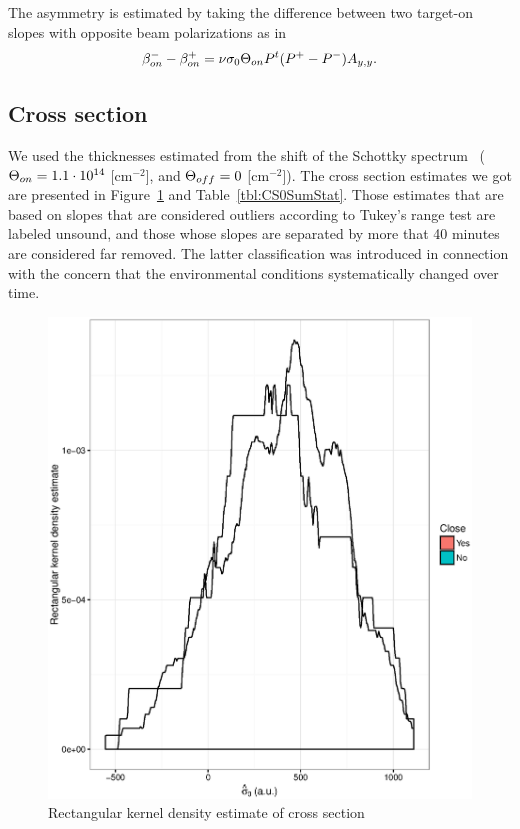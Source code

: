 \documentclass{report}
\begin{document}
The asymmetry is estimated by taking the difference between two target-on slopes with opposite beam polarizations as in
\[
	\slp[on]^- - \slp[on]^+ = \nu\CS[0]\Thick[on] P^t\DP*\Ayy.
\]
\subsection{Cross section}
We used the thicknesses estimated from the shift of the Schottky spectrum~\cite{Stein} ($\Thick[on] = \vp{1.1}{14}$ [cm$^{-2}$], and $\Thick[off] = 0$ [cm$^{-2}$]). The cross section estimates we got are presented in Figure~\ref{fig:CS0au_dens} and Table~\ref{tbl:CS0SumStat}. Those estimates that are based on slopes that are considered outliers according to Tukey's range test are labeled unsound, and those whose slopes are separated by more that 40 minutes are considered far removed. The latter classification was introduced in connection with the concern that the environmental conditions systematically changed over time.

\begin{figure}
	\centering
	\includegraphics{CS0_au_dens.eps}
	\caption{Rectangular kernel density estimate of cross section\label{fig:CS0au_dens}}
\end{figure}
\end{document}
